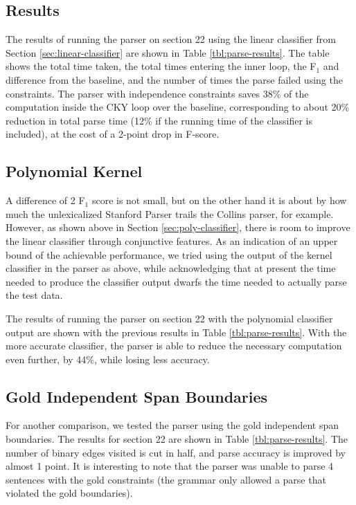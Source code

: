 \documentclass[11pt]{article}
\begin{document}
\subsection{Results}
\label{sec-5-2}
\label{sec:parse-results}

The results of running the parser on section 22 using the linear classifier from
Section \ref{sec:linear-classifier} are shown in Table
\ref{tbl:parse-results}. The table shows the total time taken, the total
times entering the inner loop, the F$_{\text{1}}$ and difference from the baseline, and the
number of times the parse failed using the constraints. The parser with
independence constraints saves 38\% of the computation inside the CKY loop over
the baseline, corresponding to about 20\% reduction in total parse time (12\% if
the running time of the classifier is included), at the cost of a 2-point drop
in F-score.

\subsection{Polynomial Kernel}
\label{sec-5-3}

A difference of 2 F$_{\text{1}}$ score is not small, but on the other hand it is
about by how much the unlexicalized Stanford Parser trails the Collins
parser, for example. However, as shown above in Section
\ref{sec:poly-classifier}, there is room to improve the linear
classifier through conjunctive features. As an indication of an upper
bound of the achievable performance, we tried using the output of the
kernel classifier in the parser as above, while acknowledging that at
present the time needed to produce the classifier output dwarfs the
time needed to actually parse the test data.

The results of running the parser on section 22 with the polynomial classifier
output are shown with the previous results in Table \ref{tbl:parse-results}.
With the more accurate classifier, the parser is able to reduce the necessary
computation even further, by 44\%, while losing less accuracy. 

\subsection{Gold Independent Span Boundaries}
\label{sec-5-4}

For another comparison, we tested the parser using the gold independent span
boundaries. The results for section 22 are shown in Table
\ref{tbl:parse-results}. The number of binary edges visited is cut in half, and
parse accuracy is improved by almost 1 point. It is interesting to note that the
parser was unable to parse 4 sentences with the gold constraints (the grammar
only allowed a parse that violated the gold boundaries).
\end{document}
